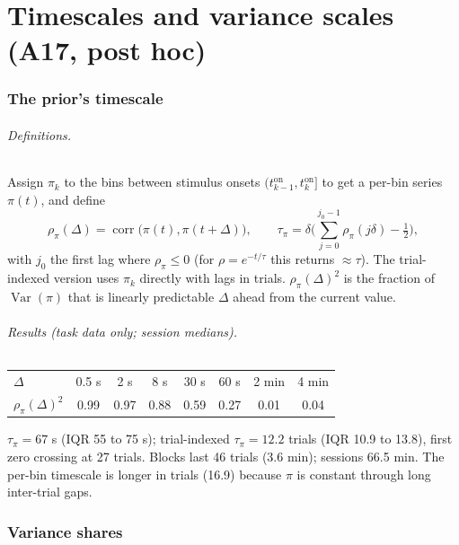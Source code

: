 \documentclass[11pt]{article}
\newcommand{\Var}{\operatorname{Var}}
\newcommand{\corr}{\operatorname{corr}}
\begin{document}
\part{Timescales and variance scales (A17, post hoc)}

\section{The prior's timescale}

\paragraph{Definitions.} Assign $\pi_k$ to the bins between stimulus onsets $(t^{\mathrm{on}}_{k-1}, t^{\mathrm{on}}_k]$
to get a per-bin series $\pi(t)$, and define
\begin{equation}
\rho_\pi(\Delta) = \corr\big(\pi(t), \pi(t+\Delta)\big), \qquad
\tau_\pi = \delta\Big(\sum_{j=0}^{j_0 - 1} \rho_\pi(j\delta) - \tfrac12\Big),
\end{equation}
with $j_0$ the first lag where $\rho_\pi \le 0$ (for $\rho = e^{-t/\tau}$ this returns $\approx \tau$). The
trial-indexed version uses $\pi_k$ directly with lags in trials. $\rho_\pi(\Delta)^2$ is the fraction of $\Var(\pi)$
that is linearly predictable $\Delta$ ahead from the current value.

\paragraph{Results (task data only; session medians).}
\begin{center}
\begin{tabular}{lccccccc}
\toprule
$\Delta$ & 0.5 s & 2 s & 8 s & 30 s & 60 s & 2 min & 4 min \\
$\rho_\pi(\Delta)^2$ & 0.99 & 0.97 & 0.88 & 0.59 & 0.27 & 0.01 & 0.04 \\
\bottomrule
\end{tabular}
\end{center}
$\tau_\pi = 67$ s (IQR 55 to 75 s); trial-indexed $\tau_\pi = 12.2$ trials (IQR 10.9 to 13.8), first zero crossing at
27 trials. Blocks last 46 trials (3.6 min); sessions 66.5 min. The per-bin timescale is longer in trials (16.9)
because $\pi$ is constant through long inter-trial gaps.

\section{Variance shares}
\end{document}
